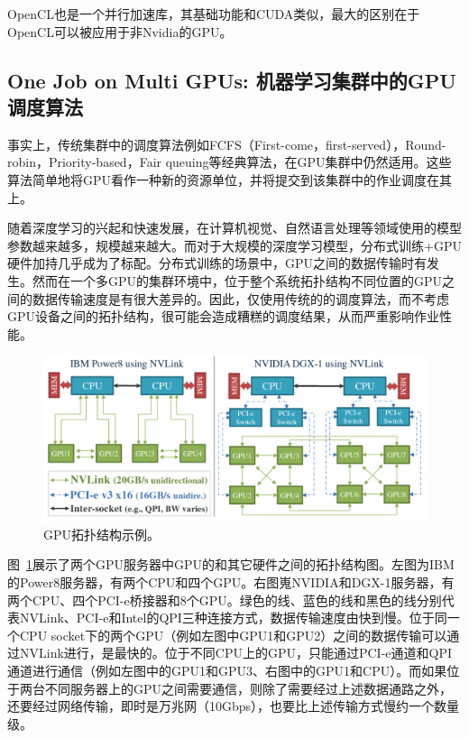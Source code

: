 OpenCL也是一个并行加速库，其基础功能和CUDA类似，最大的区别在于OpenCL可以被应用于非Nvidia的GPU。

\subsection{One Job on Multi GPUs: 机器学习集群中的GPU调度算法}
事实上，传统集群中的调度算法例如FCFS（First-come，first-served），Round-robin，Priority-based，Fair queuing等经典算法，在GPU集群中仍然适用。这些算法简单地将GPU看作一种新的资源单位，并将提交到该集群中的作业调度在其上。

随着深度学习的兴起和快速发展，在计算机视觉、自然语言处理等领域使用的模型参数越来越多，规模越来越大。而对于大规模的深度学习模型，分布式训练+GPU硬件加持几乎成为了标配。分布式训练的场景中，GPU之间的数据传输时有发生。然而在一个多GPU的集群环境中，位于整个系统拓扑结构不同位置的GPU之间的数据传输速度是有很大差异的。因此，仅使用传统的的调度算法，而不考虑GPU设备之间的拓扑结构，很可能会造成糟糕的调度结果，从而严重影响作业性能。

\begin{figure}[h]
    \centerline{\includegraphics[width=\textwidth]{figures/gpu-topology.png}}
    \caption{GPU拓扑结构示例。}
    \label{gpu_topology}
\end{figure}

图~\ref{gpu_topology}展示了两个GPU服务器中GPU的和其它硬件之间的拓扑结构图。左图为IBM的Power8服务器，有两个CPU和四个GPU。右图嵬NVIDIA和DGX-1服务器，有两个CPU、四个PCI-e桥接器和8个GPU。绿色的线、蓝色的线和黑色的线分别代表NVLink、PCI-e和Intel的QPI三种连接方式，数据传输速度由快到慢。位于同一个CPU socket下的两个GPU（例如左图中GPU1和GPU2）之间的数据传输可以通过NVLink进行，是最快的。位于不同CPU上的GPU，只能通过PCI-e通道和QPI通道进行通信（例如左图中的GPU1和GPU3、右图中的GPU1和CPU）。而如果位于两台不同服务器上的GPU之间需要通信，则除了需要经过上述数据通路之外，还要经过网络传输，即时是万兆网（10Gbps），也要比上述传输方式慢约一个数量级。


